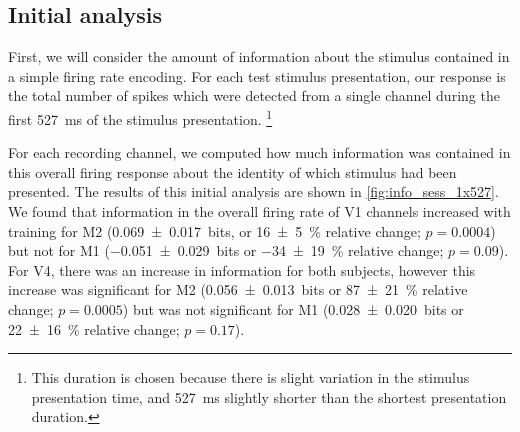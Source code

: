 \subsection{Initial analysis}
\label{sec:pl_initial}

First, we will consider the amount of information about the stimulus contained in a simple firing rate encoding.
For each test stimulus presentation, our response is the total number of spikes which were detected from a single channel during the first \SI{527}{\milli\second} of the stimulus presentation.%
\footnote{This duration is chosen because there is slight variation in the stimulus presentation time, and \SI{527}{\milli\second} slightly shorter than the shortest presentation duration.}

For each recording channel, we computed how much information was contained in this overall firing response about the identity of which stimulus had been presented.
The results of this initial analysis are shown in \autoref{fig:info_sess_1x527}.
We found that information in the overall firing rate of \ac{V1} channels increased with training for \ac{M2} (\SI{+0.069\pm0.017}{bits}, or \SI{+16\pm5}{\percent} relative change; $p=0.0004$) but not for \ac{M1} (\SI{-0.051\pm0.029}{bits} or \SI{-34\pm19}{\percent} relative change; $p=0.09$).
For \ac{V4}, there was an increase in information for both subjects, however this increase was significant for \ac{M2} (\SI{+0.056\pm0.013}{bits} or \SI{+87\pm21}{\percent} relative change; $p=0.0005$) but was not significant for \ac{M1} (\SI{+0.028\pm0.020}{bits} or \SI{+22\pm16}{\percent} relative change; $p=0.17$).


